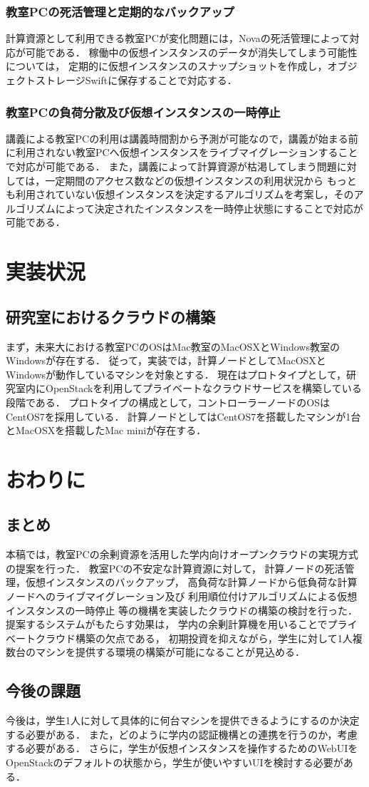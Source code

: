 \documentclass[11pt,a4paper]{jsarticle}
\begin{document}
\subsubsection{教室PCの死活管理と定期的なバックアップ}
計算資源として利用できる教室PCが変化問題には，Novaの死活管理によって対応が可能である．
稼働中の仮想インスタンスのデータが消失してしまう可能性については，
定期的に仮想インスタンスのスナップショットを作成し，オブジェクトストレージSwiftに保存することで対応する．
\subsubsection{教室PCの負荷分散及び仮想インスタンスの一時停止}
講義による教室PCの利用は講義時間割から予測が可能なので，講義が始まる前に利用されない教室PCへ仮想インスタンスをライブマイグレーションすることで対応が可能である．
また，講義によって計算資源が枯渇してしまう問題に対しては，一定期間のアクセス数などの仮想インスタンスの利用状況から
もっとも利用されていない仮想インスタンスを決定するアルゴリズムを考案し，そのアルゴリズムによって決定されたインスタンスを一時停止状態にすることで対応が可能である．

\section{実装状況}
\subsection{研究室におけるクラウドの構築}
まず，未来大における教室PCのOSはMac教室のMacOSXとWindows教室のWindowsが存在する．
従って，実装では，計算ノードとしてMacOSXとWindowsが動作しているマシンを対象とする．
現在はプロトタイプとして，研究室内にOpenStackを利用してプライベートなクラウドサービスを構築している段階である．
プロトタイプの構成として，コントローラーノードのOSはCentOS7を採用している．
計算ノードとしてはCentOS7を搭載したマシンが1台とMacOSXを搭載したMac miniが存在する．

\section{おわりに}
\subsection{まとめ}
本稿では，教室PCの余剰資源を活用した学内向けオープンクラウドの実現方式の提案を行った．
教室PCの不安定な計算資源に対して，
計算ノードの死活管理，仮想インスタンスのバックアップ，
高負荷な計算ノードから低負荷な計算ノードへのライブマイグレーション及び
利用順位付けアルゴリズムによる仮想インスタンスの一時停止
等の機構を実装したクラウドの構築の検討を行った．
提案するシステムがもたらす効果は，
学内の余剰計算機を用いることでプライベートクラウド構築の欠点である，
初期投資を抑えながら，学生に対して1人複数台のマシンを提供する環境の構築が可能になることが見込める．
\subsection{今後の課題}
今後は，学生1人に対して具体的に何台マシンを提供できるようにするのか決定する必要がある．
また，どのように学内の認証機構との連携を行うのか，考慮する必要がある．
さらに，学生が仮想インスタンスを操作するためのWebUIをOpenStackのデフォルトの状態から，学生が使いやすいUIを検討する必要がある．


\end{document}
